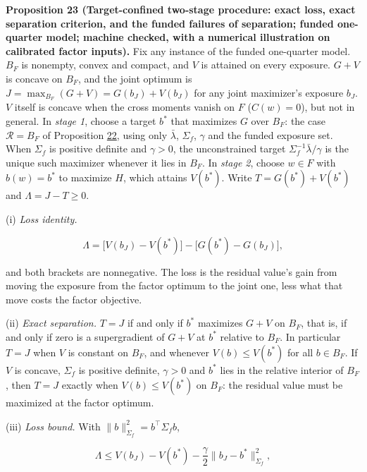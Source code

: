 \documentclass[11pt]{article}
\begin{document}
\label{res:Proposition-23}
\textbf{Proposition 23 (Target-confined two-stage procedure: exact loss, exact separation criterion, and the funded failures of separation; funded one-quarter model; machine checked, with a numerical illustration on calibrated factor inputs).}
Fix any instance of the funded one-quarter model. \(B_F\) is
nonempty, convex and compact, and \(V\) is attained on every
exposure. \(G+V\) is concave on \(B_F\), and the joint optimum is
\(J=\max_{B_F}(G+V)=G(b_J)+V(b_J)\) for any joint maximizer's
exposure \(b_J\). \(V\) itself is concave when the cross moments
vanish on \(F\) (\(C(w)=0\)), but not in general. In \emph{stage 1},
choose a target \(b^*\) that maximizes \(G\) over \(B_F\): the case
\(\mathcal R=B_F\) of Proposition \hyperref[res:Proposition-22]{22}, using only \(\bar\lambda\),
\(\Sigma_f\), \(\gamma\) and the funded exposure set. When
\(\Sigma_f\) is positive definite and \(\gamma>0\), the unconstrained
target \(\Sigma_f^{-1}\bar\lambda/\gamma\) is the unique such maximizer
whenever it lies in \(B_F\). In \emph{stage 2}, choose \(w\in F\) with
\(b(w)=b^*\) to maximize \(H\), which attains \(V(b^*)\). Write
\(T=G(b^*)+V(b^*)\) and \(\Lambda=J-T\geq0\).

(i) \emph{Loss identity.}

\begin{equation*}
\Lambda=\bigl[V(b_J)-V(b^*)\bigr]-\bigl[G(b^*)-G(b_J)\bigr],\tag{70}\label{eq:70}
\end{equation*}

and both brackets are nonnegative. The loss is the residual value's
gain from moving the exposure from the factor optimum to the joint
one, less what that move costs the factor objective.

(ii) \emph{Exact separation.} \(T=J\) if and only if \(b^*\) maximizes
\(G+V\) on \(B_F\), that is, if and only if zero is a supergradient
of \(G+V\) at \(b^*\) relative to \(B_F\). In particular \(T=J\)
when \(V\) is constant on \(B_F\), and whenever
\(V(b)\leq V(b^*)\) for all \(b\in B_F\). If \(V\) is concave,
\(\Sigma_f\) is positive definite, \(\gamma>0\) and \(b^*\) lies in
the relative interior of \(B_F\), then \(T=J\) exactly when
\(V(b)\leq V(b^*)\) on \(B_F\): the residual value must be
maximized at the factor optimum.

(iii) \emph{Loss bound.} With \(\|b\|_{\Sigma_f}^2=b^\top\Sigma_fb\),

\begin{equation*}
\Lambda\leq V(b_J)-V(b^*)-\frac\gamma2\|b_J-b^*\|_{\Sigma_f}^2,
\end{equation*}
\end{document}
